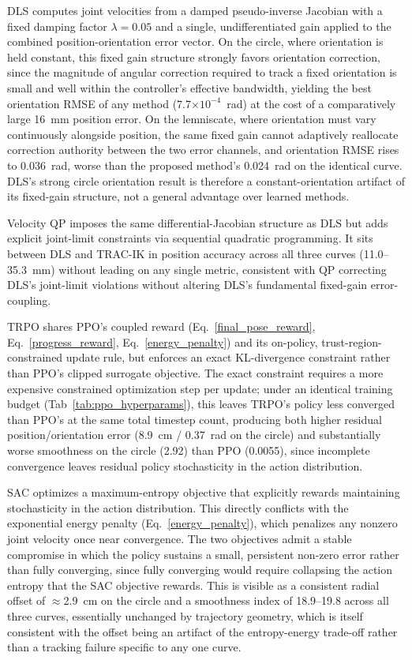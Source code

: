 \documentclass[preprint,12pt]{elsarticle}
\begin{document}
DLS computes joint velocities from a damped pseudo-inverse Jacobian with
a fixed damping factor $\lambda = 0.05$ and a single, undifferentiated
gain applied to the combined position-orientation error vector. On the
circle, where orientation is held constant, this fixed gain structure
strongly favors orientation correction, since the magnitude of angular
correction required to track a fixed orientation is small and well within
the controller's effective bandwidth, yielding the best orientation RMSE
of any method (7.7$\times10^{-4}$~rad) at the cost of a comparatively
large 16~mm position error. On the lemniscate, where orientation must
vary continuously alongside position, the same fixed gain cannot
adaptively reallocate correction authority between the two error
channels, and orientation RMSE rises to 0.036~rad, worse than the
proposed method's 0.024~rad on the identical curve. DLS's strong circle
orientation result is therefore a constant-orientation artifact of its
fixed-gain structure, not a general advantage over learned methods.

Velocity QP imposes the same differential-Jacobian structure as DLS but
adds explicit joint-limit constraints via sequential quadratic programming. It sits between DLS and TRAC-IK in position accuracy across all three curves (11.0--35.3~mm) without leading on any single metric, consistent with QP correcting DLS's joint-limit violations without altering DLS's fundamental fixed-gain error-coupling. 

TRPO shares PPO's coupled reward (Eq.~\ref{final_pose_reward}, Eq.~\ref{progress_reward}, Eq.~\ref{energy_penalty}) and its on-policy,
trust-region-constrained update rule, but enforces an exact KL-divergence
constraint rather than PPO's clipped surrogate objective. The exact
constraint requires a more expensive constrained optimization step per
update; under an identical training budget (Tab~\ref{tab:ppo_hyperparams}), this leaves TRPO's
policy less converged than PPO's at the same total timestep count,
producing both higher residual position/orientation error (8.9~cm /
0.37~rad on the circle) and substantially worse smoothness on the circle
(2.92) than PPO (0.0055), since incomplete convergence leaves residual
policy stochasticity in the action distribution.

SAC optimizes a maximum-entropy objective that explicitly rewards
maintaining stochasticity in the action distribution. This directly
conflicts with the exponential energy penalty (Eq.~\ref{energy_penalty}), which penalizes any nonzero joint velocity once near convergence. The two objectives admit a stable compromise in which the policy sustains a small, persistent non-zero error rather than fully converging, since fully converging would require collapsing the action entropy that the SAC objective rewards. This is visible as a consistent radial offset of $\approx$2.9~cm on the circle and a smoothness index of 18.9--19.8 across all three curves, essentially unchanged by trajectory geometry, which is itself consistent with the offset being an artifact of the entropy-energy trade-off rather than a tracking failure specific to any one curve.
\end{document}
